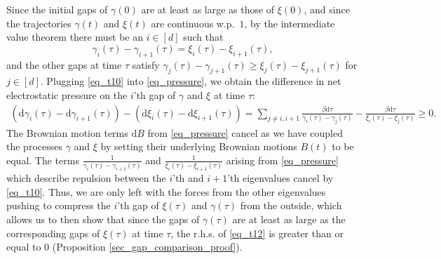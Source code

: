 \documentclass[11pt,letterpaper]{article}
\begin{document}
Since the initial gaps of $\gamma(0)$ are at least as large as those of $\xi(0)$, and since the trajectories $\gamma(t)$ and $\xi(t)$ are continuous w.p.\ $1$, by the intermediate value theorem there must be an $i\in[d]$ such that 
%
\begin{equation}\label{eq_t10}
     \gamma_i(\tau) - \gamma_{i+1}(\tau) = \xi_i(\tau) - \xi_{i+1}(\tau),
\end{equation}
%
and the other gaps at time $\tau$ satisfy
%
   $\gamma_j(\tau) - \gamma_{j+1}(\tau) \geq \xi_j(\tau) - \xi_{j+1}(\tau)$ for $j \in [d]$. 
%
Plugging \eqref{eq_t10} into \eqref{eq_pressure}, we
%
obtain the difference in net electrostatic pressure on the $i$'th gap of $\gamma$ and $\xi$ at time $\tau$:
%
\begin{eqnarray}
      (\mathrm{d} \gamma_i(\tau) - \mathrm{d} \gamma_{i+1} (\tau)) -   (\mathrm{d} \xi_i(\tau) - \mathrm{d} \xi_{i+1} (\tau)) 
     =  \sum_{j \neq i, i+1} \frac{\beta \mathrm{d}\tau}{\gamma_i(\tau) - \gamma_j(\tau)}  -  \frac{\beta  \mathrm{d}\tau  }{\xi_i(\tau) - \xi_j(\tau)}
     \geq 0. \label{eq_t12}
\end{eqnarray}
%
The Brownian motion terms $\mathrm{d}B$ from \eqref{eq_pressure} 
cancel as we have coupled the processes $\gamma$ and $\xi$ by setting their underlying Brownian motions $B(t)$ to be equal. 
%
The terms $\frac{1}{\gamma_i(\tau) - \gamma_{i+1}(\tau)}$ and  $\frac{1}{\xi_i(\tau) - \xi_{i+1}(\tau)}$ arising from  \eqref{eq_pressure} which describe repulsion between the $i$'th and $i+1$'th eigenvalues cancel 
by \eqref{eq_t10}.
%
Thus, we are only left with the forces from the other eigenvalues pushing to compress the $i$'th gap of $\xi(\tau)$ and $\gamma(\tau)$ from the outside, which 
%
 allows us to then show that since 
the gaps of $\gamma(\tau)$ are at least as large as the corresponding gaps of $\xi(\tau)$ at time $\tau$, the r.h.s. of \eqref{eq_t12} is greater than or equal to $0$ (Proposition \ref{sec_gap_comparison_proof}).
\end{document}
